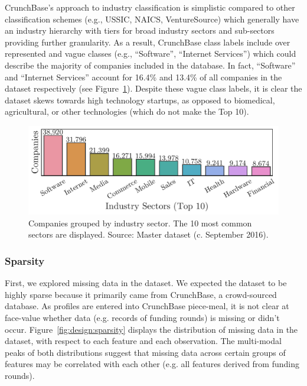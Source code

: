 \documentclass[../thesis/thesis.tex]{subfiles}
\begin{document}
CrunchBase's approach to industry classification is simplistic compared to other classification schemes (e.g., USSIC, NAICS, VentureSource) which generally have an industry hierarchy with tiers for broad industry sectors and sub-sectors providing further granularity. As a result, CrunchBase class labels include over represented and vague classes (e.g., ``Software'', ``Internet Services'') which could describe the majority of companies included in the database. In fact, ``Software'' and ``Internet Services'' account for 16.4\% and 13.4\% of all companies in the dataset respectively (see Figure~\ref{fig:design:industry_counts}). Despite these vague class labels, it is clear the dataset skews towards high technology startups, as opposed to biomedical, agricultural, or other technologies (which do not make the Top 10).

\begin{figure}[!htb]
    \centering
    \includegraphics[width=\textwidth]{../figures/design/descriptives_counts_industry}
    \caption[Company counts by industry sector]{Companies grouped by industry sector. The 10 most common sectors are displayed. Source: Master dataset (c. September 2016).}
    \label{fig:design:industry_counts}
\end{figure}

\subsubsection{Sparsity} %

First, we explored missing data in the dataset. We expected the dataset to be highly sparse because it primarily came from CrunchBase, a crowd-sourced database. As profiles are entered into CrunchBase piece-meal, it is not clear at face-value whether data (e.g. records of funding rounds) is missing or didn't occur. Figure~\ref{fig:design:sparsity} displays the distribution of missing data in the dataset, with respect to each feature and each observation. The multi-modal peaks of both distributions suggest that missing data across certain groups of features may be correlated with each other (e.g. all features derived from funding rounds).
\end{document}
